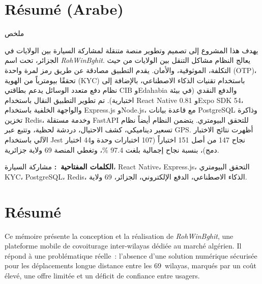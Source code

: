 \chapter*{Résumé (Arabe)}
\begin{center}
\LARGE \textarabic{ملخص}
\end{center}
\thispagestyle{plain}

\begin{center}
\begin{minipage}{0.92\textwidth}
\begin{Arabic}
يهدف هذا المشروع إلى تصميم وتطوير منصة متنقلة لمشاركة السيارة بين الولايات في الجزائر، تحت اسم \textit{RohWinBghit}. يعالج النظام مشاكل التنقل بين الولايات من حيث التكلفة، الموثوقية، والأمان. يقدم التطبيق مصادقة عن طريق رمز لمرة واحدة (OTP)، تحققًا بيومترياً من الهوية (KYC) باستخدام تقنيات الذكاء الاصطناعي، بالإضافة إلى نظام دفع متعدد الوسائل يدعم بطاقتي CIB وEdahabia والدفع النقدي (في بيئة اختبارية). تم تطوير التطبيق النقال باستخدام React Native 0.81 وExpo SDK 54، والواجهة الخلفية باستخدام Express.js وNode.js، مع قاعدة بيانات PostgreSQL وذاكرة تخزين Redis، وخدمة مستقلة FastAPI للتحقق البيومتري. يتضمن النظام أيضاً نظام تسعير ديناميكي، كشف الاحتيال، دردشة لحظية، وتتبع عبر GPS. أظهرت نتائج الاختبار الآلي باستخدام Jest نجاح 147 من أصل 151 اختباراً (107 اختبارات وحدة و44 اختبار دمج)، بنسبة نجاح إجمالية بلغت 97.4 \%، وتغطي المنصة 69 ولاية جزائرية.

\vspace{0.5cm}
\textbf{الكلمات المفتاحية~:} مشاركة السيارة، React Native، Express.js، التحقق البيومتري KYC، PostgreSQL، Redis، الذكاء الاصطناعي، الدفع الإلكتروني، الجزائر، 69 ولاية.
\end{Arabic}
\end{minipage}
\end{center}

\chapter*{Résumé}
\thispagestyle{plain}

Ce mémoire présente la conception et la réalisation de \textit{RohWinBghit}, une plateforme mobile de covoiturage inter-wilayas dédiée au marché algérien. Il répond à une problématique réelle~: l'absence d'une solution numérique sécurisée pour les déplacements longue distance entre les 69~wilayas, marqués par un coût élevé, une offre limitée et un déficit de confiance entre usagers.

